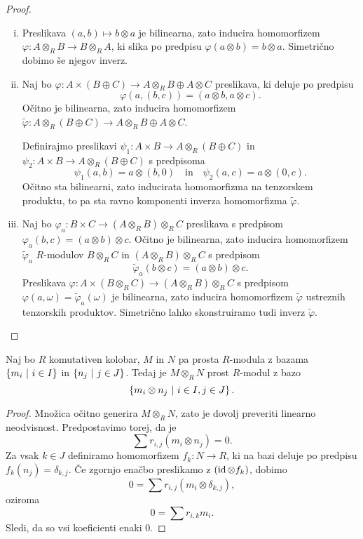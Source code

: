 \pagebreak[2]
\begin{proof}
\phantom{a}
\begin{enumerate}[i)]
\item Preslikava $(a, b) \mapsto b \otimes a$ je bilinearna, zato
inducira homomorfizem
$\varphi \colon A \otimes_R B \to B \otimes_R A$, ki slika po
predpisu $\varphi(a \otimes b) = b \otimes a$. Simetrično dobimo še
njegov inverz.
\item Naj bo $\varphi \colon A \times (B \oplus C) \to
A \otimes_R B \oplus A \otimes C$ preslikava, ki deluje po predpisu
\[
\varphi(a, (b, c)) = (a \otimes b, a \otimes c).
\]
Očitno je bilinearna, zato inducira homomorfizem
$\tilde{\varphi} \colon A \otimes_R (B \oplus C) \to
A \otimes_R B \oplus A \otimes C$.

Definirajmo preslikavi
$\psi_1 \colon A \times B \to A \otimes_R (B \oplus C)$ in
$\psi_2 \colon A \times B \to A \otimes_R (B \oplus C)$ s
predpisoma
\[
\psi_1(a, b) = a \otimes (b, 0)
\quad \text{in} \quad
\psi_2(a, c) = a \otimes(0, c).
\]
Očitno sta bilinearni, zato inducirata homomorfizma na tenzorskem
produktu, to pa sta ravno komponenti inverza homomorfizma
$\tilde{\varphi}$.
\item Naj bo
$\varphi_a \colon B \times C \to (A \otimes_R B) \otimes_R C$
preslikava s predpisom $\varphi_a(b,c) = (a \otimes b) \otimes c$.
Očitno je bilinearna, zato inducira homomorfizem
$\tilde{\varphi}_a$ $R$-modulov $B \otimes_R C$ in
$(A \otimes_R B) \otimes_R C$ s predpisom
\[
\tilde{\varphi}_a(b \otimes c) = (a \otimes b) \otimes c.
\]
Preslikava $\varphi \colon A \times (B \otimes_R C) \to
(A \otimes_R B) \otimes_R C$ s predpisom
$\varphi(a, \omega) = \tilde{\varphi}_a(\omega)$ je bilinearna,
zato inducira homomorfizem $\tilde{\varphi}$ ustreznih tenzorskih
produktov. Simetrično lahko skonstruiramo tudi inverz
$\tilde{\varphi}$. \qedhere
\end{enumerate}
\end{proof}


\begin{trditev}
Naj bo $R$ komutativen kolobar, $M$ in $N$ pa prosta $R$-modula z
bazama $\left\{m_i~\middle\vert~i \in I\right\}$ in $\left\{n_j~\middle\vert~j \in J\right\}$. Tedaj je
$M \otimes_R N$ prost $R$-modul z bazo
\[
\left\{m_i \otimes n_j~\middle\vert~i \in I, j \in J\right\}.
\]
\end{trditev}

\begin{proof}
Množica očitno generira $M \otimes_R N$, zato je dovolj preveriti
linearno neodvisnost. Predpostavimo torej, da je
\[
\sum r_{i,j} (m_i \otimes n_j) = 0.
\]
Za vsak $k \in J$ definiramo homomorfizem $f_k \colon N \to R$,
ki na bazi deluje po predpisu $f_k(n_j) = \delta_{k,j}$. Če
zgornjo enačbo preslikamo z $(\operatorname{id} \otimes f_k)$, dobimo
\[
0 = \sum r_{i,j} (m_i \otimes \delta_{k,j}),
\]
oziroma
\[
0 = \sum r_{i,k} m_i.
\]
Sledi, da so vsi koeficienti enaki $0$.
\end{proof}

